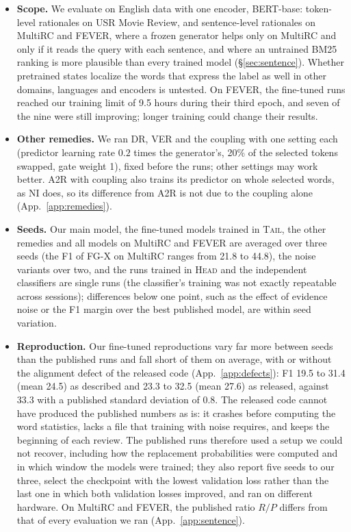 \documentclass[11pt]{article}
\newcommand{\HEAD}{\textup{\textsc{Head}}}
\newcommand{\TAIL}{\textup{\textsc{Tail}}}
\begin{document}
\begin{itemize}
  \setlength\itemsep{1pt}
  \item \textbf{Scope.} We evaluate on English data with one encoder, BERT-base: token-level rationales on USR Movie Review, and sentence-level rationales on MultiRC and FEVER, where a frozen generator helps only on MultiRC and only if it reads the query with each sentence, and where an untrained BM25 ranking is more plausible than every trained model (\S\ref{sec:sentence}). Whether pretrained states localize the words that express the label as well in other domains, languages and encoders is untested. On FEVER, the fine-tuned runs reached our training limit of 9.5 hours during their third epoch, and seven of the nine were still improving; longer training could change their results.
  \item \textbf{Other remedies.} We ran DR, VER and the coupling with one setting each (predictor learning rate $0.2$ times the generator's, 20\% of the selected tokens swapped, gate weight 1), fixed before the runs; other settings may work better. A2R with coupling also trains its predictor on whole selected words, as NI does, so its difference from A2R is not due to the coupling alone (App.~\ref{app:remedies}).
  \item \textbf{Seeds.} Our main model, the fine-tuned models trained in \TAIL, the other remedies and all models on MultiRC and FEVER are averaged over three seeds (the F1 of FG-X on MultiRC ranges from 21.8 to 44.8), the noise variants over two, and the runs trained in \HEAD{} and the independent classifiers are single runs (the classifier's training was not exactly repeatable across sessions); differences below one point, such as the effect of evidence noise or the F1 margin over the best published model, are within seed variation.
  \item \textbf{Reproduction.} Our fine-tuned reproductions vary far more between seeds than the published runs and fall short of them on average, with or without the alignment defect of the released code (App.~\ref{app:defects}): F1 19.5 to 31.4 (mean 24.5) as described and 23.3 to 32.5 (mean 27.6) as released, against 33.3 with a published standard deviation of 0.8. The released code cannot have produced the published numbers as is: it crashes before computing the word statistics, lacks a file that training with noise requires, and keeps the beginning of each review. The published runs therefore used a setup we could not recover, including how the replacement probabilities were computed and in which window the models were trained; they also report five seeds to our three, select the checkpoint with the lowest validation loss rather than the last one in which both validation losses improved, and ran on different hardware. On MultiRC and FEVER, the published ratio $R/P$ differs from that of every evaluation we ran (App.~\ref{app:sentence}).

\end{itemize}
\end{document}
